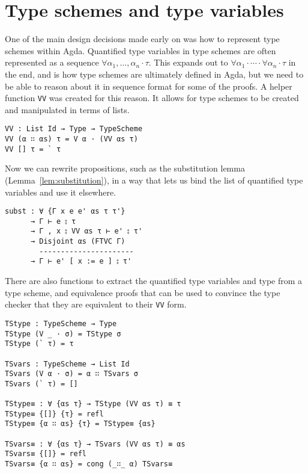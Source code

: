 \section{Type schemes and type variables}
One of the main design decisions made early on was how to represent
type schemes within Agda. Quantified type variables in type schemes are often
represented as a sequence
$\forall \alpha_1,\ldots,\alpha_n \cdot \tau$. This expands out to
$\forall \alpha_1 \cdot \cdots \cdot \forall \alpha_n \cdot \tau$ in the end, and is how type schemes are
ultimately defined in Agda, but we need to be able to reason about it
in sequence format for some of the proofs. A helper function
\texttt{VV} was created for this reason. It allows for type schemes
to be created and manipulated in terms of lists.
\begin{verbatim}
VV : List Id → Type → TypeScheme
VV (α ∷ αs) τ = V α · (VV αs τ)
VV [] τ = ` τ
\end{verbatim}
Now we can rewrite propositions, such as the substitution lemma
(Lemma~\ref{lem:substitution}), in a way that lets us bind the list
of quantified type variables and use it elsewhere.
\begin{verbatim}
subst : ∀ {Γ x e e' αs τ τ'}
      → Γ ⊢ e ⦂ τ
      → Γ , x ⦂ VV αs τ ⊢ e' ⦂ τ'
      → Disjoint αs (FTVC Γ)
        ----------------------
      → Γ ⊢ e' [ x := e ] ⦂ τ'
\end{verbatim}
There are also functions to extract the quantified type variables and
type from a type scheme, and equivalence proofs that can be used to
convince the type checker that they are equivalent to their
\texttt{VV} form.
\begin{verbatim}
TStype : TypeScheme → Type
TStype (V _ · σ) = TStype σ
TStype (` τ) = τ

TSvars : TypeScheme → List Id
TSvars (V α · σ) = α ∷ TSvars σ
TSvars (` τ) = []

TStype≡ : ∀ {αs τ} → TStype (VV αs τ) ≡ τ
TStype≡ {[]} {τ} = refl
TStype≡ {α ∷ αs} {τ} = TStype≡ {αs}

TSvars≡ : ∀ {αs τ} → TSvars (VV αs τ) ≡ αs
TSvars≡ {[]} = refl
TSvars≡ {α ∷ αs} = cong (_∷_ α) TSvars≡
\end{verbatim}


